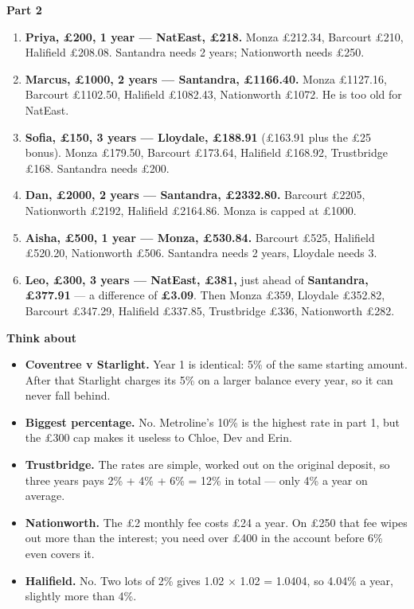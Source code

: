 \documentclass[12pt]{article}
\begin{document}
\vspace{4mm}
{\bfseries\large Part 2}
\begin{enumerate}[leftmargin=8mm,itemsep=2mm,topsep=2mm]
  \item \textbf{Priya, \pounds200, 1 year --- NatEast, \pounds218.}
        Monza \pounds212.34, Barcourt \pounds210, Halifield \pounds208.08. Santandra needs 2 years; Nationworth needs \pounds250.
  \item \textbf{Marcus, \pounds1000, 2 years --- Santandra, \pounds1166.40.}
        Monza \pounds1127.16, Barcourt \pounds1102.50, Halifield \pounds1082.43, Nationworth \pounds1072. He is too old for NatEast.
  \item \textbf{Sofia, \pounds150, 3 years --- Lloydale, \pounds188.91} (\pounds163.91 plus the \pounds25 bonus).
        Monza \pounds179.50, Barcourt \pounds173.64, Halifield \pounds168.92, Trustbridge \pounds168. Santandra needs \pounds200.
  \item \textbf{Dan, \pounds2000, 2 years --- Santandra, \pounds2332.80.}
        Barcourt \pounds2205, Nationworth \pounds2192, Halifield \pounds2164.86. Monza is capped at \pounds1000.
  \item \textbf{Aisha, \pounds500, 1 year --- Monza, \pounds530.84.}
        Barcourt \pounds525, Halifield \pounds520.20, Nationworth \pounds506. Santandra needs 2 years, Lloydale needs 3.
  \item \textbf{Leo, \pounds300, 3 years --- NatEast, \pounds381,} just ahead of \textbf{Santandra, \pounds377.91} --- a difference of \textbf{\pounds3.09}.
        Then Monza \pounds359, Lloydale \pounds352.82, Barcourt \pounds347.29, Halifield \pounds337.85, Trustbridge \pounds336, Nationworth \pounds282.
\end{enumerate}

\vspace{4mm}
{\bfseries\large Think about}
\begin{itemize}[leftmargin=5mm,itemsep=2mm,topsep=2mm]
  \item \textbf{Coventree v Starlight.} Year 1 is identical: 5\% of the same starting amount. After that Starlight charges its 5\% on a larger balance every year, so it can never fall behind.
  \item \textbf{Biggest percentage.} No. Metroline's 10\% is the highest rate in part 1, but the \pounds300 cap makes it useless to Chloe, Dev and Erin.
  \item \textbf{Trustbridge.} The rates are simple, worked out on the original deposit, so three years pays 2\% + 4\% + 6\% = 12\% in total --- only 4\% a year on average.
  \item \textbf{Nationworth.} The \pounds2 monthly fee costs \pounds24 a year. On \pounds250 that fee wipes out more than the interest; you need over \pounds400 in the account before 6\% even covers it.
  \item \textbf{Halifield.} No. Two lots of 2\% gives 1.02 $\times$ 1.02 = 1.0404, so 4.04\% a year, slightly more than 4\%.
\end{itemize}
\end{document}
